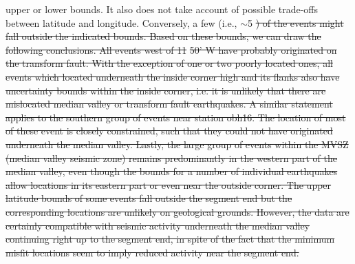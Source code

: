 \documentclass[jgrga]{agu2001} %
\newlength{\tw}
\providecommand{\DIFdel}[1]{{\protect\color{red}\sout{#1}}}                      %
\begin{document}
\begin{article}
{upper or lower bounds. It also does not take account of possible
trade-offs between latitude and longitude.  Conversely, a few
(i.e., $\sim$5}%
\DIFdel{) of the events might fall outside the indicated
bounds.  Based on these bounds, we can draw the following conclusions.
All events west of 11}%
\DIFdel{50' W  have probably originated on the transform
fault.  With the exception of one or two poorly located ones, all
events which located underneath the inside corner high and its flanks
also have uncertainty bounds within the inside corner, i.e. it is unlikely
that there are mislocated median valley or transform fault
earthquakes.  A similar statement applies to the southern group of
events near station obh16.  The location of most of these event is
closely constrained, such that they could not have originated underneath
the median valley.   Lastly, the large group of events within the MVSZ
(median valley seismic zone) remains predominantly in the western part of the median
valley, even though the bounds for a number of individual earthquakes
allow locations in its eastern part or even near the outside corner.
The upper latitude bounds of
some events fall outside the segment end but the corresponding locations are
unlikely on geological grounds.  However, the data are certainly
compatible with seismic activity underneath the
median valley continuing right up to the segment end, in spite of the
fact that the minimum misfit locations seem to imply reduced activity
near the segment end. 
}%


\end{article}
\end{document}
